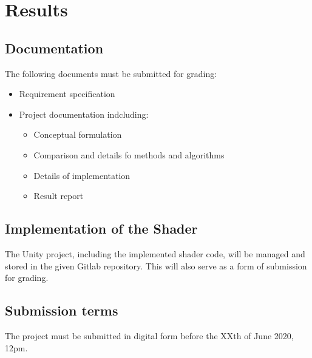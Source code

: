 \section{Results}

\subsection{Documentation}
The following documents must be submitted for grading:
\begin{itemize}
    \item Requirement specification
    \item Project documentation indcluding:
    \begin{itemize}
        \item Conceptual formulation
        \item Comparison and details fo methods and algorithms
        \item Details of implementation
        \item Result report
    \end{itemize}
\end{itemize}

\subsection{Implementation of the Shader}
The Unity project, including the implemented shader code, will be managed and stored in the given Gitlab repository\cite{gitlab}. This will also serve as a form of submission for grading.

\subsection{Submission terms}
The project must be submitted in digital form before the XXth of June 2020, 12pm.
